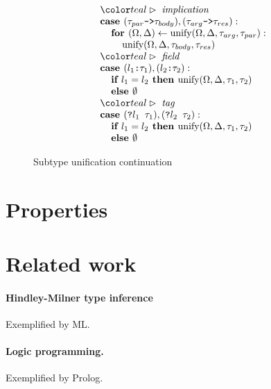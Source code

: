 \documentclass[acmsmall]{acmart}
\begin{document}
\begin{figure*}[h]
\[\begin{array}[t]{@{} l}
    \\

    \I \C{implication}
    \\
    \I \B{case } (\code{$\tau_{par}$->$\tau_{body}$}), (\code{$\tau_{arg}$->$\tau_{res}$}) : 
    \\
    \I\I \B{for } (\Omega, \Delta) \leftarrow \F{unify}(\Omega, \Delta, \tau_{arg}, \tau_{par}):
    \\
    \I\I\I \F{unify}(\Omega, \Delta, \tau_{body}, \tau_{res})

    \\

    \I \C{field}
    \\
    \I \B{case } (\code{$l_1$:$\tau_1$}), (\code{$l_2$:$\tau_2$}) :
    \\
    \I\I \B{if } l_1 = l_2 \B{ then } \F{unify}(\Omega, \Delta, \tau_1, \tau_2)
    \\
    \I\I \B{else } \emptyset 

    \\

    \I \C{tag}
    \\
    \I \B{case } (\code{?$l_1$ $\tau_1$}), (\code{?$l_2$ $\tau_2$}) :
    \\
    \I\I \B{if } l_1 = l_2 \B{ then } \F{unify}(\Omega, \Delta, \tau_1, \tau_2)
    \\
    \I\I \B{else } \emptyset 
\end{array}
\]

\caption{Subtype unification continuation}
\label{fig:unifyContinue}
\end{figure*}


\section{Properties}

\section{Related work}

\paragraph{Hindley-Milner type inference}
Exemplified by ML.

\paragraph{Logic programming.}
Exemplified by Prolog. 
\end{document}
